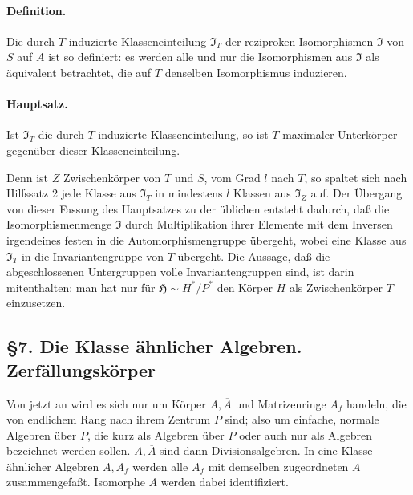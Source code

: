 \documentclass[11pt]{article}
\begin{document}
\paragraph{Definition.}
Die durch \(T\) induzierte Klasseneinteilung \(\mathfrak I_T\) der reziproken Isomorphismen \(\mathfrak I\) von \(S\) auf \(A\) ist so definiert: es werden alle und nur die Isomorphismen aus \(\mathfrak I\) als äquivalent betrachtet, die auf \(T\) denselben Isomorphismus induzieren.

\paragraph{Hauptsatz.}
Ist \(\mathfrak I_T\) die durch \(T\) induzierte Klasseneinteilung, so ist \(T\) maximaler Unterkörper gegenüber dieser Klasseneinteilung.

Denn ist \(Z\) Zwischenkörper von \(T\) und \(S\), vom Grad \(l\) nach \(T\), so spaltet sich nach Hilfssatz 2 jede Klasse aus \(\mathfrak I_T\) in mindestens \(l\) Klassen aus \(\mathfrak I_Z\) auf. Der Übergang von dieser Fassung des Hauptsatzes zu der üblichen entsteht dadurch, daß die Isomorphismenmenge \(\mathfrak I\) durch Multiplikation ihrer Elemente mit dem Inversen irgendeines festen in die Automorphismengruppe übergeht, wobei eine Klasse aus \(\mathfrak I_T\) in die Invariantengruppe von \(T\) übergeht. Die Aussage, daß die abgeschlossenen Untergruppen volle Invariantengruppen sind, ist darin mitenthalten; man hat nur für \(\mathfrak H\sim H^*/P^*\) den Körper \(H\) als Zwischenkörper \(T\) einzusetzen.

\subsection*{§7. Die Klasse ähnlicher Algebren. Zerfällungskörper}

Von jetzt an wird es sich nur um Körper \(A,\overline A\) und Matrizenringe \(A_f\) handeln, die von endlichem Rang nach ihrem Zentrum \(P\) sind; also um einfache, normale Algebren über \(P\), die kurz als Algebren über \(P\) oder auch nur als Algebren bezeichnet werden sollen. \(A,\overline A\) sind dann Divisionsalgebren. In eine Klasse ähnlicher Algebren \(A,A_f\) werden alle \(A_f\) mit demselben zugeordneten \(A\) zusammengefaßt. Isomorphe \(A\) werden dabei identifiziert.
\end{document}
